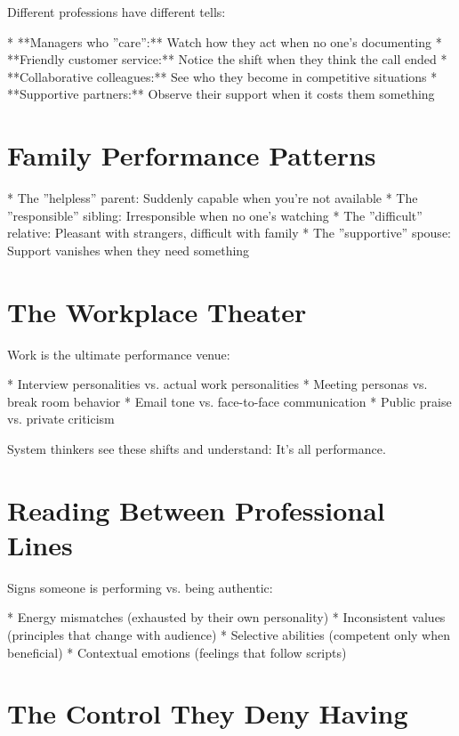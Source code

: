 \documentclass[12pt,oneside]{book}
\begin{document}
Different professions have different tells:

                    * **Managers who ''care'':** Watch how they act when no one's documenting
                    * **Friendly customer service:** Notice the shift when they think the call ended
                    * **Collaborative colleagues:** See who they become in competitive situations
                    * **Supportive partners:** Observe their support when it costs them something

\section{Family Performance Patterns}

                    * The ''helpless'' parent: Suddenly capable when you're not available
                    * The ''responsible'' sibling: Irresponsible when no one's watching
                    * The ''difficult'' relative: Pleasant with strangers, difficult with family
                    * The ''supportive'' spouse: Support vanishes when they need something

\section{The Workplace Theater}

Work is the ultimate performance venue:

                    * Interview personalities vs. actual work personalities
                    * Meeting personas vs. break room behavior
                    * Email tone vs. face-to-face communication
                    * Public praise vs. private criticism

System thinkers see these shifts and understand: It's all performance.

\section{Reading Between Professional Lines}

Signs someone is performing vs. being authentic:

                    * Energy mismatches (exhausted by their own personality)
                    * Inconsistent values (principles that change with audience)
                    * Selective abilities (competent only when beneficial)
                    * Contextual emotions (feelings that follow scripts)

\section{The Control They Deny Having}
\end{document}
